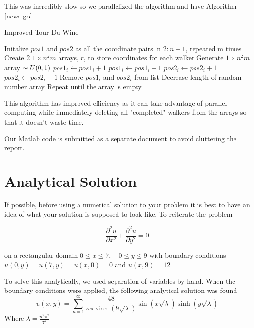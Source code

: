 \documentclass{amsart}
\begin{document}
This was incredibly slow so we parallelized the algorithm and have Algorithm \ref{newalgo}
\begin{algorithm}
	\caption{Improved Tour Du Wino}
	\label{newalgo}
	\begin{algorithmic}[1]
		\State Initalize $pos1$ and $pos2$ as all the coordinate pairs in $2:n-1$, repeated m  times
		\State Create 2 $1 \times n^2m$ arrays, $r$, to store coordinates for each walker
		\State Generate $1 \times n^2m$ array $\thicksim U(0,1)$
			\State $pos1_i \gets pos1_i + 1$
			\State $pos1_i \gets pos1_i - 1$
			\State $pos2_i \gets pos2_i + 1$
		\Else
			\State $pos2_i \gets pos2_i - 1$
		\EndIf
			\State Remove $pos1_i$ and $pos2_i$ from list
			\State Decrease length of random number array
		\EndIf
		\State Repeat until the array is empty
	\end{algorithmic}
\end{algorithm}

This algorithm has improved efficiency as it can take advantage of parallel computing while immediately deleting all "completed" walkers from the arrays so that it doesn't waste time.

Our Matlab code is submitted as a separate document to avoid cluttering the report.

\section{Analytical Solution}

If possible, before using a numerical solution to your problem it is best to have an idea of what your solution is supposed to look like. To reiterate the problem

	$$\frac{\partial^2 u}{\partial x^2} + \frac{\partial^2 u}{\partial y^2} = 0$$

on a rectangular domain $0 \leq x \leq 7, \quad 0 \leq y \leq 9$ with boundary conditions $u(0,y) = u(7,y) = u(x,0) = 0$ and $u(x,9) = 12$ 

To solve this analytically, we used separation of variables by hand. When the boundary conditions were applied, the following analytical solution was found
\begin{equation}
    u(x,y)= \sum _{n=1}^{\infty} \frac{48}{n \pi \sinh(9 \sqrt{\lambda})} \sin(x \sqrt{\lambda}) \sinh(y \sqrt{\lambda})
\end{equation}
Where $\lambda=\frac{n^2 \pi ^2}{7^2}$
\end{document}

